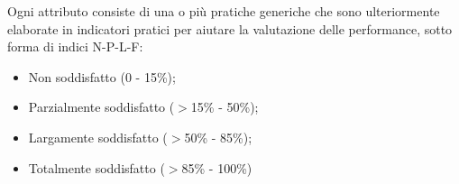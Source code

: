 \documentclass[PianoDiQualifica.tex]{subfiles}
\begin{document}
\begin{appendices}
		Ogni attributo consiste di una o più pratiche generiche che sono ulteriormente elaborate in indicatori pratici per aiutare la valutazione delle performance, sotto forma di indici N-P-L-F:
		\begin{itemize}
			\item Non soddisfatto (0 - 15\%);
			\item Parzialmente soddisfatto ($ > $15\% - 50\%);
			\item Largamente soddisfatto ($ > $50\% - 85\%);
			\item Totalmente soddisfatto ($ > $85\% - 100\%)
		\end{itemize}
		
	\end{appendices}
\end{document}
